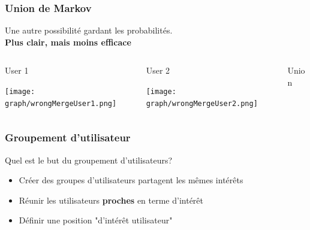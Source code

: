 \documentclass{beamer}
\begin{document}
            \begin{frame}
            \frametitle{Union de Markov}
            Une autre possibilité gardant les probabilités.\\
            \pause[5]\textbf{Plus clair, mais moins efficace}
            \pause[2]
            \begin{columns}[t]
            \begin{column}{3cm}
            \begin{exampleblock}{User 1}
            \begin{center}
            \texttt{[image: graph/wrongMergeUser1.png]}
            \end{center}
            \end{exampleblock}
            \end{column}
            \begin{column}{3cm}
            \begin{exampleblock}{User 2}
            \begin{center}
            \texttt{[image: graph/wrongMergeUser2.png]}
            \end{center}
            \end{exampleblock}
            \end{column}
            \pause[3]
            \begin{column}{3cm}
            \begin{exampleblock}{Union}
            \begin{center}
            \pause[4]
            \end{center}
            \end{exampleblock}
            \end{column}
            \end{columns}
            \end{frame}
            \begin{frame}
            \frametitle{Groupement d'utilisateur}
            Quel est le but du groupement d'utilisateurs?
            \pause
            \begin{itemize}
            \item Créer des groupes d'utilisateurs partagent les mêmes intérêts
            \pause
            \item Réunir les utilisateurs \textbf{proches} en terme d'intérêt
            \pause
            \item Définir une position "d'intérêt utilisateur"
            \end{itemize}
            \end{frame}
\end{document}
